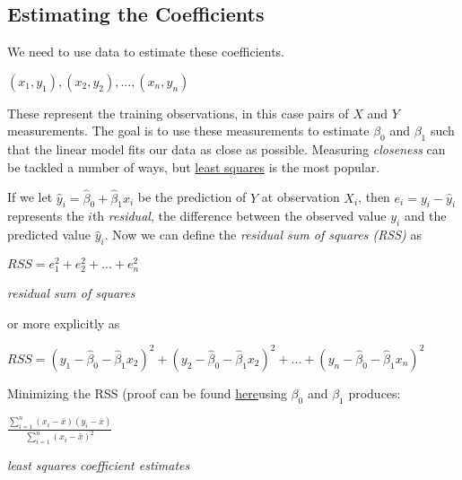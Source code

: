 \documentclass[]{book}
\theoremstyle{definition}
\theoremstyle{definition}
\theoremstyle{definition}
\theoremstyle{remark}
\begin{document}
\subsection{Estimating the
Coefficients}\label{estimating-the-coefficients}

We need to use data to estimate these coefficients.

\((x_1,y_1), (x_2,y_2),..., (x_n,y_n)\)

These represent the training observations, in this case pairs of \(X\)
and \(Y\) measurements. The goal is to use these measurements to
estimate \(\beta_0\) and \(\beta_1\) such that the linear model fits our
data as close as possible. Measuring \emph{closeness} can be tackled a
number of ways, but
\href{https://en.wikipedia.org/wiki/Least_squares}{least squares} is the
most popular.

If we let \(\hat y_i = \hat\beta_0 + \hat\beta_1x_i\) be the prediction
of \(Y\) at observation \(X_i\), then \(e_i = y_i - \hat y_i\)
represents the \(i\)th \emph{residual}, the difference between the
observed value \(y_i\) and the predicted value \(\hat y_i\). Now we can
define the \emph{residual sum of squares (RSS)} as

\(RSS = e_1^2 + e_2^2 + ... + e_n^2\)

\emph{residual sum of squares}

or more explicitly as

\(RSS = (y_1 - \hat\beta_0 - \hat\beta_1x_2)^2 + (y_2 - \hat\beta_0 - \hat\beta_1x_2)^2 + ... + (y_n - \hat\beta_0 - \hat\beta_1x_n)^2\)

Minimizing the RSS (proof can be found
\href{https://en.m.wikipedia.org/wiki/Simple_linear_regression\#Derivation_of_simple_regression_estimators}{here}using
\(\beta_0\) and \(\beta_1\) produces:

\(\frac{\displaystyle \sum_{i=1}^{n}(x_i-\bar x)(y_i - \bar x)}{\displaystyle\sum_{i=1}^{n}(x_i - \bar x)^2}\)

\emph{least squares coefficient estimates}
\end{document}
